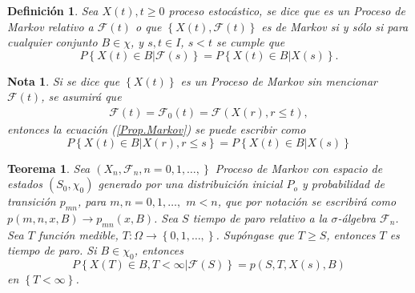 \documentclass{article}
\newtheorem{Def}{Definición}
\newtheorem{Teo}{Teorema}
\newtheorem{Note}{Nota}
\begin{document}
\begin{Def}
Sea $X\left(t\right),t\geq0$ proceso estoc\'astico, se dice que es
un Proceso de Markov relativo a $\mathcal{F}\left(t\right)$ o que
$\left\{X\left(t\right),\mathcal{F}\left(t\right)\right\}$ es de
Markov si y s\'olo si para cualquier conjunto $B\in\chi$,  y
$s,t\in I$, $s<t$ se cumple que
\begin{equation}\label{Prop.Markov}
P\left\{X\left(t\right)\in
B|\mathcal{F}\left(s\right)\right\}=P\left\{X\left(t\right)\in
B|X\left(s\right)\right\}.
\end{equation}
\end{Def}
\begin{Note}
Si se dice que $\left\{X\left(t\right)\right\}$ es un Proceso de
Markov sin mencionar $\mathcal{F}\left(t\right)$, se asumir\'a que
\begin{eqnarray*}
\mathcal{F}\left(t\right)=\mathcal{F}_{0}\left(t\right)=\mathcal{F}\left(X\left(r\right),r\leq
t\right),
\end{eqnarray*}
entonces la ecuaci\'on (\ref{Prop.Markov}) se puede escribir como
\begin{equation}
P\left\{X\left(t\right)\in B|X\left(r\right),r\leq s\right\} =
P\left\{X\left(t\right)\in B|X\left(s\right)\right\}
\end{equation}
\end{Note}



\begin{Teo}
Sea $\left(X_{n},\mathcal{F}_{n},n=0,1,\ldots,\right\}$ Proceso de
Markov con espacio de estados $\left(S_{0},\chi_{0}\right)$
generado por una distribuici\'on inicial $P_{o}$ y probabilidad de
transici\'on $p_{mn}$, para $m,n=0,1,\ldots,$ $m<n$, que por
notaci\'on se escribir\'a como $p\left(m,n,x,B\right)\rightarrow
p_{mn}\left(x,B\right)$. Sea $S$ tiempo de paro relativo a la
$\sigma$-\'algebra $\mathcal{F}_{n}$. Sea $T$ funci\'on medible,
$T:\Omega\rightarrow\left\{0,1,\ldots,\right\}$. Sup\'ongase que
$T\geq S$, entonces $T$ es tiempo de paro. Si $B\in\chi_{0}$,
entonces
\begin{equation}\label{Prop.Fuerte.Markov}
P\left\{X\left(T\right)\in
B,T<\infty|\mathcal{F}\left(S\right)\right\} =
p\left(S,T,X\left(s\right),B\right)
\end{equation}
en $\left\{T<\infty\right\}$.
\end{Teo}
\end{document}
